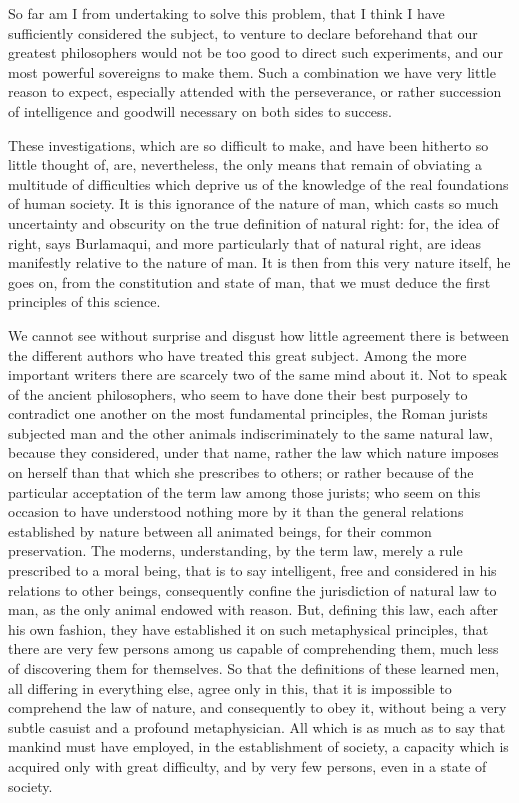 \documentclass[12pt]{report}
\begin{document}
So far am I from undertaking to solve this problem, that I think I have sufficiently considered the subject, to venture to declare beforehand that our greatest philosophers would not be too good to direct such experiments, and our most powerful sovereigns to make them. Such a combination we have very little reason to expect, especially attended with the perseverance, or rather succession of intelligence and goodwill necessary on both sides to success.

These investigations, which are so difficult to make, and have been hitherto so little thought of, are, nevertheless, the only means that remain of obviating a multitude of difficulties which deprive us of the knowledge of the real foundations of human society. It is this ignorance of the nature of man, which casts so much uncertainty and obscurity on the true definition of natural right: for, the idea of right, says Burlamaqui, and more particularly that of natural right, are ideas manifestly relative to the nature of man. It is then from this very nature itself, he goes on, from the constitution and state of man, that we must deduce the first principles of this science.

We cannot see without surprise and disgust how little agreement there is between the different authors who have treated this great subject. Among the more important writers there are scarcely two of the same mind about it. Not to speak of the ancient philosophers, who seem to have done their best purposely to contradict one another on the most fundamental principles, the Roman jurists subjected man and the other animals indiscriminately to the same natural law, because they considered, under that name, rather the law which nature imposes on herself than that which she prescribes to others; or rather because of the particular acceptation of the term law among those jurists; who seem on this occasion to have understood nothing more by it than the general relations established by nature between all animated beings, for their common preservation. The moderns, understanding, by the term law, merely a rule prescribed to a moral being, that is to say intelligent, free and considered in his relations to other beings, consequently confine the jurisdiction of natural law to man, as the only animal endowed with reason. But, defining this law, each after his own fashion, they have established it on such metaphysical principles, that there are very few persons among us capable of comprehending them, much less of discovering them for themselves. So that the definitions of these learned men, all differing in everything else, agree only in this, that it is impossible to comprehend the law of nature, and consequently to obey it, without being a very subtle casuist and a profound metaphysician. All which is as much as to say that mankind must have employed, in the establishment of society, a capacity which is acquired only with great difficulty, and by very few persons, even in a state of society.
\end{document}
